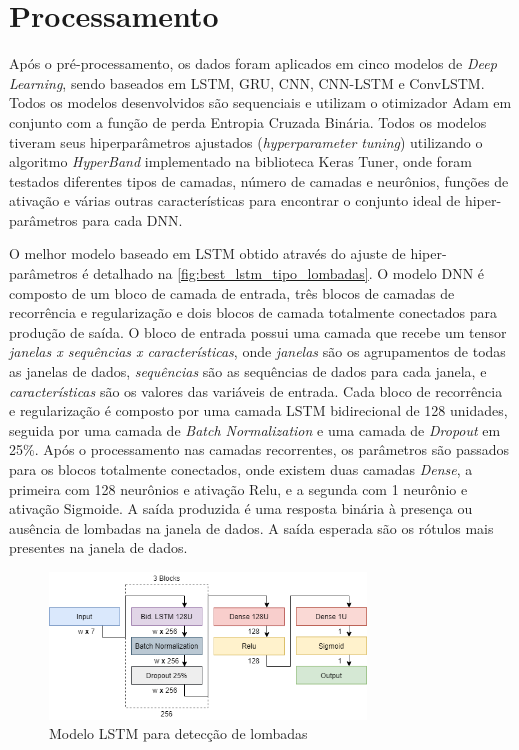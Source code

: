 \section{Processamento}

Após o pré-processamento, os dados foram aplicados em cinco modelos de \textit{Deep Learning}, sendo baseados em LSTM, GRU, CNN, CNN-LSTM e ConvLSTM. Todos os modelos desenvolvidos são sequenciais e utilizam o otimizador Adam em conjunto com a função de perda Entropia Cruzada Binária. Todos os modelos tiveram seus hiperparâmetros ajustados (\textit{hyperparameter tuning}) utilizando o algoritmo \textit{HyperBand} implementado na biblioteca Keras Tuner, onde foram testados diferentes tipos de camadas, número de camadas e neurônios, funções de ativação e várias outras características para encontrar o conjunto ideal de hiper-parâmetros para cada DNN. 

O melhor modelo baseado em LSTM obtido através do ajuste de hiper-parâmetros é detalhado na \autoref{fig:best_lstm_tipo_lombadas}. O modelo DNN é composto de um bloco de camada de entrada, três blocos de camadas de recorrência e regularização e dois blocos de camada totalmente conectados para produção de saída. O bloco de entrada possui uma camada que recebe um tensor \emph{janelas x sequências x características}, onde \emph{janelas} são os agrupamentos de todas as janelas de dados, \emph{sequências} são as sequências de dados para cada janela, e \emph{características} são os valores das variáveis de entrada. Cada bloco de recorrência e regularização é composto por uma camada LSTM bidirecional de 128 unidades, seguida por uma camada de \textit{Batch Normalization} e uma camada de \textit{Dropout} em 25\%. Após o processamento nas camadas recorrentes, os parâmetros são passados para os blocos totalmente conectados, onde existem duas camadas \textit{Dense}, a primeira com 128 neurônios e ativação Relu, e a segunda com 1 neurônio e ativação Sigmoide. A saída produzida é uma resposta binária à presença ou ausência de lombadas na janela de dados. A saída esperada são os rótulos mais presentes na janela de dados.

\begin{figure}[h!]
  \centering
  \caption{Modelo LSTM para detecção de lombadas}
  \label{fig:best_lstm_tipo_lombadas}
  \includegraphics[width=0.75\textwidth]{figuras/fig_40.png}
\end{figure}

